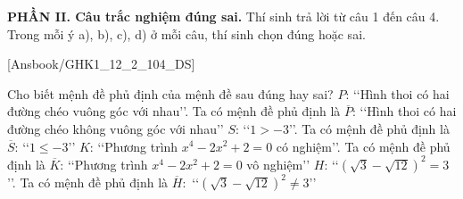 \documentclass[12pt,a4paper,openany,oneside]{book}
\newcommand{\phanDe}[1]{\par\medskip\noindent #1\par\smallskip}
\begin{document}

\phanDe{\textbf{PHẦN II. Câu trắc nghiệm đúng sai.} Thí sinh trả lời từ câu 1 đến câu 4. Trong mỗi ý a), b), c), d) ở mỗi câu, thí sinh chọn đúng hoặc sai.}

\setcounter{ex}{0}

[Ansbook/GHK1_12_2_104_DS]

\begin{ex}%
	Cho biết mệnh đề phủ định của mệnh đề sau  đúng hay sai?
	\choiceTF 
		{$P$: \lq\lq Hình thoi có hai đường chéo vuông góc với nhau\rq\rq. Ta  có mệnh đề phủ định là $\overline{P}$: \lq\lq Hình thoi có hai đường chéo không vuông góc với nhau\rq\rq}
		{$S$: \lq\lq $1>-3$\rq\rq.  Ta có mệnh đề phủ định là $\overline{S}$: \lq\lq $1\leq-3$\rq\rq}
		 {\True $K$: \lq\lq Phương trình $x^4-2x^2+2=0$ có nghiệm\rq\rq. Ta có mệnh đề phủ định là $\overline{K}$: \lq\lq Phương trình $x^4-2x^2+2=0$ vô nghiệm\rq\rq}
		{$H$: \lq\lq $(\sqrt{3}-\sqrt{12})^2=3$\rq\rq. Ta có mệnh đề phủ định là  $\overline{H}:$ \lq\lq $(\sqrt{3}-\sqrt{12})^2\neq 3$\rq\rq}
\end{ex}
\end{document}
